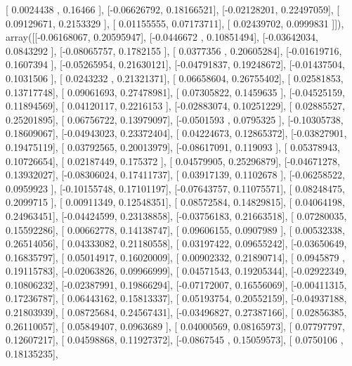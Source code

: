\documentclass{article}
\begin{document}
       [ 0.0024438 ,  0.16466   ],
       [-0.06626792,  0.18166521],
       [-0.02128201,  0.22497059],
       [ 0.09129671,  0.2153329 ],
       [ 0.01155555,  0.07173711],
       [ 0.02439702,  0.0999831 ]]), array([[-0.06168067,  0.20595947],
       [-0.0446672 ,  0.10851494],
       [-0.03642034,  0.0843292 ],
       [-0.08065757,  0.1782155 ],
       [ 0.0377356 ,  0.20605284],
       [-0.01619716,  0.1607394 ],
       [-0.05265954,  0.21630121],
       [-0.04791837,  0.19248672],
       [-0.01437504,  0.1031506 ],
       [ 0.0243232 ,  0.21321371],
       [ 0.06658604,  0.26755402],
       [ 0.02581853,  0.13717748],
       [ 0.09061693,  0.27478981],
       [ 0.07305822,  0.1459635 ],
       [-0.04525159,  0.11894569],
       [ 0.04120117,  0.2216153 ],
       [-0.02883074,  0.10251229],
       [ 0.02885527,  0.25201895],
       [ 0.06756722,  0.13979097],
       [-0.0501593 ,  0.0795325 ],
       [-0.10305738,  0.18609067],
       [-0.04943023,  0.23372404],
       [ 0.04224673,  0.12865372],
       [-0.03827901,  0.19475119],
       [ 0.03792565,  0.20013979],
       [-0.08617091,  0.119093  ],
       [ 0.05378943,  0.10726654],
       [ 0.02187449,  0.175372  ],
       [ 0.04579905,  0.25296879],
       [-0.04671278,  0.13932027],
       [-0.08306024,  0.17411737],
       [ 0.03917139,  0.1102678 ],
       [-0.06258522,  0.0959923 ],
       [-0.10155748,  0.17101197],
       [-0.07643757,  0.11075571],
       [ 0.08248475,  0.2099715 ],
       [ 0.00911349,  0.12548351],
       [ 0.08572584,  0.14829815],
       [ 0.04064198,  0.24963451],
       [-0.04424599,  0.23138858],
       [-0.03756183,  0.21663518],
       [ 0.07280035,  0.15592286],
       [ 0.00662778,  0.14138747],
       [ 0.09606155,  0.0907989 ],
       [ 0.00532338,  0.26514056],
       [ 0.04333082,  0.21180558],
       [ 0.03197422,  0.09655242],
       [-0.03650649,  0.16835797],
       [ 0.05014917,  0.16020009],
       [ 0.00902332,  0.21890714],
       [ 0.0945879 ,  0.19115783],
       [-0.02063826,  0.09966999],
       [ 0.04571543,  0.19205344],
       [-0.02922349,  0.10806232],
       [-0.02387991,  0.19866294],
       [-0.07172007,  0.16556069],
       [-0.00411315,  0.17236787],
       [ 0.06443162,  0.15813337],
       [ 0.05193754,  0.20552159],
       [-0.04937188,  0.21803939],
       [ 0.08725684,  0.24567431],
       [-0.03496827,  0.27387166],
       [ 0.02856385,  0.26110057],
       [ 0.05849407,  0.0963689 ],
       [ 0.04000569,  0.08165973],
       [ 0.07797797,  0.12607217],
       [ 0.04598868,  0.11927372],
       [-0.0867545 ,  0.15059573],
       [ 0.0750106 ,  0.18135235],
\end{document}
